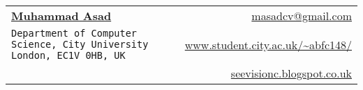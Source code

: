 \documentclass[letterpaper,11pt]{article}
\begin{document}
\newcommand{\mywebheader}{
\begin{tabular*}{7in}{l@{\extracolsep{\fill}}r}
	\textbf{\href{http://seevisionc.blogspot.co.uk}{\LARGE Muhammad Asad}} & \href{mailto:masadcv@gmail.com}{masadcv@gmail.com}\\
	{\footnotesize \texttt{Department of Computer Science, City University London, EC1V 0HB, UK}} & \href{http://www.student.city.ac.uk/~abfc148/}{www.student.city.ac.uk/\textasciitilde abfc148/} \\
	{\footnotesize  } & \href{http://seevisionc.blogspot.co.uk}{seevisionc.blogspot.co.uk}\\
	\end{tabular*}
\\
\vspace{0.1in}}

\mywebheader
\end{document}
